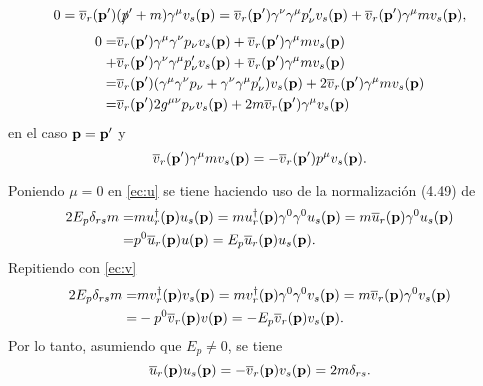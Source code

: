 \documentclass{article}
\begin{document}
\begin{enumerate}
\begin{equation}
\end{equation}
\begin{equation}
0=\overline{v}_r(\vb{p'})(\slashed{p}'+m)\gamma^\mu v_s(\vb{p})=\overline{v}_r(\vb{p'})\gamma^\nu\gamma^\mu p'_\nu v_s(\vb{p})+\overline{v}_r(\vb{p'})\gamma^\mu m v_s(\vb{p}),
\end{equation}
\begin{align}\label{ec:v_original}
\begin{split}
0=&\overline{v}_r(\vb{p'})\gamma^\mu\gamma^\nu p_\nu v_s(\vb{p})+\overline{v}_r(\vb{p'})\gamma^\mu m v_s(\vb{p})\\
+&\overline{v}_r(\vb{p'})\gamma^\nu\gamma^\mu p'_\nu v_s(\vb{p})+\overline{v}_r(\vb{p'})\gamma^\mu m v_s(\vb{p})\\
=&\overline{v}_r(\vb{p'})\qty(\gamma^\mu\gamma^\nu p_\nu+\gamma^\nu\gamma^\mu p'_\nu) v_s(\vb{p})+2\overline{v}_r(\vb{p'})\gamma^\mu m v_s(\vb{p})\\
=&\overline{v}_r(\vb{p'})2g^{\mu\nu} p_\nu v_s(\vb{p})+2m\overline{v}_r(\vb{p'})\gamma^\mu v_s(\vb{p})
\end{split}
\end{align}
en el caso $\vb{p}=\vb{p'}$ y
\begin{equation}\label{ec:v}
\overline{v}_r(\vb{p'})\gamma^\mu m v_s(\vb{p})=-\overline{v}_r(\vb{p'})p^\mu v_s(\vb{p}).
\end{equation}

Poniendo $\mu=0$ en \eqref{ec:u} se tiene haciendo uso de la normalización (4.49) de \cite{Lahiri2005}
\begin{align}
\begin{split}
2E_p\delta_{rs}m=&mu^\dagger_r(\vb{p})u_s(\vb{p})=mu^\dagger_r(\vb{p})\gamma^0\gamma^0 u_s(\vb{p})=m\overline{u}_r(\vb{p})\gamma^0 u_s(\vb{p})\\
=&p^0\overline{u}_r(\vb{p})u(\vb{p})=E_p\overline{u}_r(\vb{p})u_s(\vb{p}).
\end{split}
\end{align} 
Repitiendo con \eqref{ec:v}
\begin{align}
\begin{split}
2E_p\delta_{rs}m=&mv^\dagger_r(\vb{p})v_s(\vb{p})=mv^\dagger_r(\vb{p})\gamma^0\gamma^0 v_s(\vb{p})=m\overline{v}_r(\vb{p})\gamma^0 v_s(\vb{p})\\
=&-p^0\overline{v}_r(\vb{p})v(\vb{p})=-E_p\overline{v}_r(\vb{p})v_s(\vb{p}).
\end{split}
\end{align} 
Por lo tanto, asumiendo que $E_p\neq 0$, se tiene
\begin{equation}
\overline{u}_r(\vb{p})u_s(\vb{p})=-\overline{v}_r(\vb{p})v_s(\vb{p})=2m\delta_{rs}.
\end{equation}  


\end{enumerate}
\end{document}

